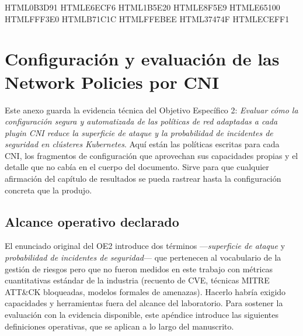 
\definecolor{oe2azul}    {HTML}{0B3D91}   %
\definecolor{oe2azulcl}  {HTML}{E6ECF6}   %
\definecolor{oe2verde}   {HTML}{1B5E20}   %
\definecolor{oe2verdecl} {HTML}{E8F5E9}
\definecolor{oe2ambar}   {HTML}{E65100}   %
\definecolor{oe2ambarcl} {HTML}{FFF3E0}
\definecolor{oe2rojo}    {HTML}{B71C1C}   %
\definecolor{oe2rojocl}  {HTML}{FFEBEE}
\definecolor{oe2gris}    {HTML}{37474F}   %
\definecolor{oe2griscl}  {HTML}{ECEFF1}   %

\chapter{Configuración y evaluación de las Network Policies por CNI} \label{chap:apendice_oe2}

Este anexo guarda la evidencia técnica del Objetivo Específico 2: \emph{Evaluar cómo la configuración segura y automatizada de las políticas de red adaptadas a cada plugin CNI reduce la superficie de ataque y la probabilidad de incidentes de seguridad en clústeres Kubernetes}. Aquí están las políticas escritas para cada CNI, los fragmentos de configuración que aprovechan sus capacidades propias y el detalle que no cabía en el cuerpo del documento. Sirve para que cualquier afirmación del capítulo de resultados se pueda rastrear hasta la configuración concreta que la produjo.

\iffalse
\section{Alcance operativo declarado} \label{sec:apb2_alcance}

El enunciado original del OE2 introduce dos términos ---\emph{superficie de ataque} y \emph{probabilidad de incidentes de seguridad}--- que pertenecen al vocabulario de la gestión de riesgos pero que no fueron medidos en este trabajo con métricas cuantitativas estándar de la industria (recuento de CVE, técnicas MITRE ATT\&CK bloqueadas, modelos formales de amenazas). Hacerlo habría exigido capacidades y herramientas fuera del alcance del laboratorio. Para sostener la evaluación con la evidencia disponible, este apéndice introduce las siguientes definiciones operativas, que se aplican a lo largo del manuscrito.

